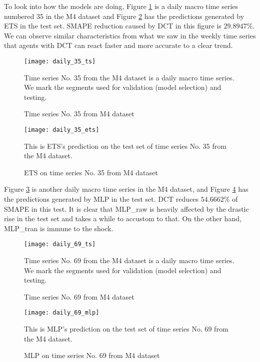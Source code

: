 To look into how the models are doing, Figure \ref{fig: daily 35 ts} is a daily macro time series numbered 35 in the M4 dataset and Figure \ref{fig: daily 35 ets} has the predictions generated by ETS in the test set. SMAPE reduction caused by DCT in this figure is $29.8947\%$. We can observe similar characteristics from what we saw in the weekly time series that agents with DCT can react faster and more accurate to a clear trend.
\begin{figure}[H]
    \centering
    \texttt{[image: daily\_35\_ts]}
    \caption{Time series No. 35 from M4 dataset}
    {\raggedright \footnotesize Time series No. 35 from the M4 dataset is a daily macro time series. We mark the segments used for validation (model selection) and testing.\par}
    \label{fig: daily 35 ts}
\end{figure}
\begin{figure}[H]
    \centering
    \texttt{[image: daily\_35\_ets]}
    \caption{ETS on time series No. 35 from M4 dataset}
    {\raggedright \footnotesize This is ETS's prediction on the test set of time series No. 35 from the M4 dataset.  \par}
    \label{fig: daily 35 ets}
\end{figure}
Figure \ref{fig: daily 69 ts} is another daily macro time series in the M4 dataset, and Figure \ref{fig: daily 69 mlp} has the predictions generated by MLP in the test set. DCT reduces $54.6662\%$ of SMAPE in this test. It is clear that MLP\_raw is heavily affected by the drastic rise in the test set and takes a while to accustom to that. On the other hand, MLP\_tran is immune to the shock.
\begin{figure}[H]
    \centering
    \texttt{[image: daily\_69\_ts]}
    \caption{Time series No. 69 from M4 dataset}
    {\raggedright \footnotesize Time series No. 69 from the M4 dataset is a daily macro time series. We mark the segments used for validation (model selection) and testing.\par}
    \label{fig: daily 69 ts}
\end{figure}
\begin{figure}[H]
    \centering
    \texttt{[image: daily\_69\_mlp]}
    \caption{MLP on time series No. 69 from M4 dataset}
    {\raggedright \footnotesize This is MLP's prediction on the test set of time series No. 69 from the M4 dataset.  \par}
    \label{fig: daily 69 mlp}
\end{figure}

